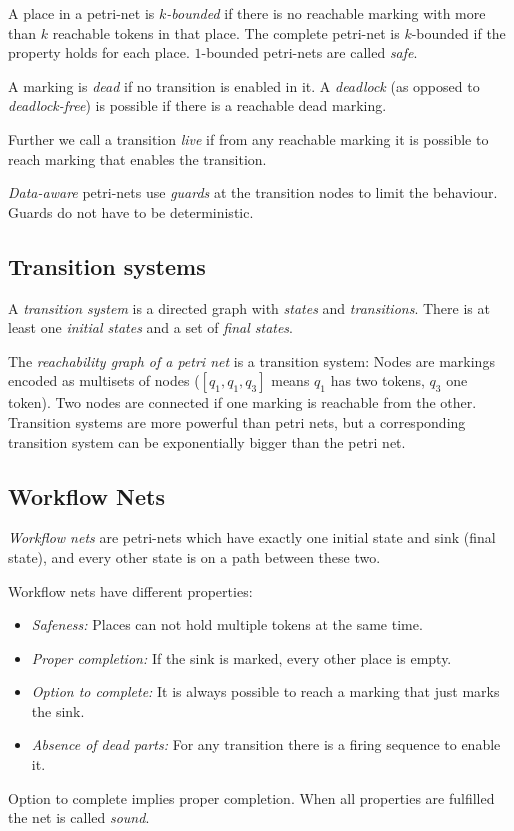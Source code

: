 \documentclass[english]{panikzettel}
\begin{document}
A place in a petri-net is \emph{$k$-bounded} if there is no reachable marking with more than $k$ reachable tokens in that place.
The complete petri-net is $k$-bounded if the property holds for each place.
$1$-bounded petri-nets are called \emph{safe}.

A marking is \emph{dead} if no transition is enabled in it.
A \emph{deadlock} (as opposed to \emph{deadlock-free}) is possible if there is a reachable dead marking.

Further we call a transition \emph{live} if from any reachable marking it is possible to reach marking that enables the transition.

\emph{Data-aware} petri-nets use \emph{guards} at the transition nodes to limit the behaviour. Guards do not have to be deterministic.

\subsection{Transition systems}

A \emph{transition system} is a directed graph with \emph{states} and \emph{transitions}.
There is at least one \emph{initial states} and a set of \emph{final states}.

The \emph{reachability graph of a petri net} is a transition system: Nodes are markings encoded as multisets of nodes ($[q_1, q_1, q_3]$ means $q_1$ has two tokens, $q_3$ one token).
Two nodes are connected if one marking is reachable from the other.
Transition systems are more powerful than petri nets, but a corresponding transition system can be exponentially bigger than the petri net.

\subsection{Workflow Nets}
\emph{Workflow nets} are petri-nets which have exactly one initial state and sink (final state), and every other state is on a path between these two.

Workflow nets have different properties:
\begin{itemize}
    \item \emph{Safeness:} Places can not hold multiple tokens at the same time.
    \item \emph{Proper completion:} If the sink is marked, every other place is empty.
    \item \emph{Option to complete:} It is always possible to reach a marking that just marks the sink.
    \item \emph{Absence of dead parts:} For any transition there is a firing sequence to enable it.
\end{itemize}
Option to complete implies proper completion. When all properties are fulfilled the net is called \emph{sound}.
\end{document}
